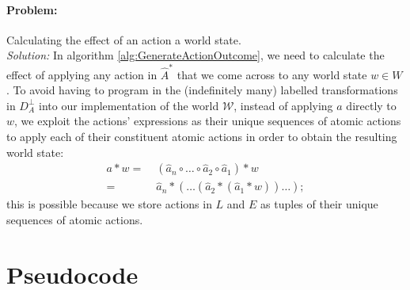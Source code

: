 \paragraph{Problem:}
Calculating the effect of an action a world state.
\\\textit{Solution:}
In algorithm \ref{alg:GenerateActionOutcome}, we need to calculate the effect of applying any action in $\hat{A}^{*}$ that we come across to any world state $w \in W$.
To avoid having to program in the (indefinitely many) labelled transformations in $D_{A}^{\bot}$ into our implementation of the world $\mathscr{W}$, instead of applying $a$ directly to $w$, we exploit the actions' expressions as their unique sequences of atomic actions to apply each of their constituent atomic actions in order to obtain the resulting world state:
\begin{equation}
\begin{aligned}
    a * w = & \; (\hat{a}_{n} \circ \dots \circ \hat{a}_{2} \circ \hat{a}_{1}) * w \\
    = & \; \hat{a}_{n} * ( \dots (\hat{a}_{2} * (\hat{a}_{1} * w)) \dots);
\end{aligned}
\end{equation}
this is possible because we store actions in $L$ and $E$ as tuples of their unique sequences of atomic actions.


\section{Pseudocode}

